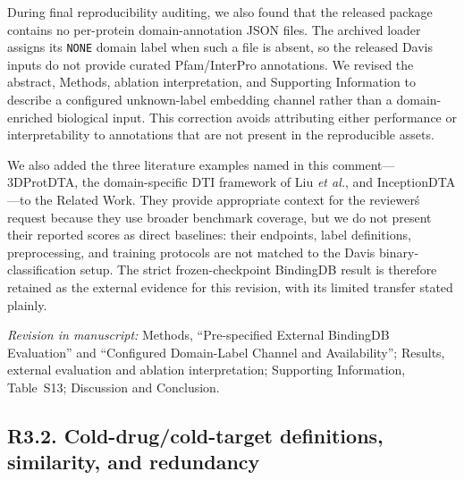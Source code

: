 \documentclass[11pt,a4paper]{article}
\newcommand{\change}[1]{\par\smallskip\noindent\textit{Revision in manuscript:} #1\par\medskip}
\begin{document}
During final reproducibility auditing, we also found that the released package
contains no per-protein domain-annotation JSON files. The archived loader assigns
its \texttt{NONE} domain label when such a file is absent, so the released Davis
inputs do not provide curated Pfam/InterPro annotations. We revised the abstract,
Methods, ablation interpretation, and Supporting Information to describe a
configured unknown-label embedding channel rather than a domain-enriched biological
 input. This correction avoids attributing either performance or interpretability
 to annotations that are not present in the reproducible assets.

We also added the three literature examples named in this comment---3DProtDTA,
the domain-specific DTI framework of Liu \textit{et al.}, and InceptionDTA---to
the Related Work. They provide appropriate context for the reviewer\'s request
because they use broader benchmark coverage, but we do not present their reported
scores as direct baselines: their endpoints, label definitions, preprocessing,
and training protocols are not matched to the Davis binary-classification setup.
The strict frozen-checkpoint BindingDB result is therefore retained as the
external evidence for this revision, with its limited transfer stated plainly.

\change{Methods, ``Pre-specified External BindingDB Evaluation'' and ``Configured
Domain-Label Channel and Availability''; Results, external evaluation and
ablation interpretation; Supporting Information, Table~S13; Discussion and
Conclusion.}

\subsection*{R3.2. Cold-drug/cold-target definitions, similarity, and redundancy}

\end{document}
